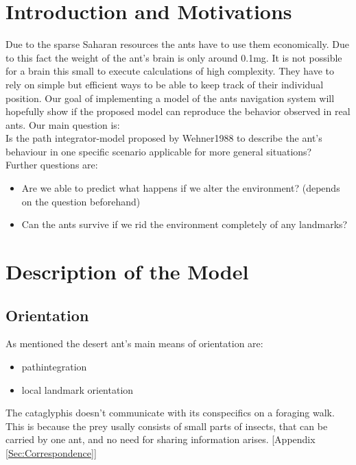 \documentclass[11pt]{article}
\begin{document}
\section{Introduction and Motivations}
 Due to the sparse Saharan resources the ants have to use them economically. Due to this fact the weight of the ant's brain is only around 0.1mg. It is not possible for a brain this small to execute calculations of high complexity. They have to rely on simple but efficient ways to be able to keep track of their individual position. Our goal of implementing a model of the ants navigation system will hopefully show if the proposed model can reproduce the behavior observed in real ants.
Our main question is:\\
Is the path integrator-model proposed by Wehner1988 \cite{Wehner1988} to describe the ant's behaviour in one specific scenario applicable for more general situations?\\
Further questions are:
\begin{itemize}
\item Are we able to predict what happens if we alter the environment? (depends on the question beforehand) 
\item Can the ants survive if we rid the environment completely of any landmarks? 
\end{itemize}


\section{Description of the Model}
\subsection{Orientation}
As mentioned the desert ant's main means of orientation are:
\begin{itemize}
\item pathintegration
\item local landmark orientation
\end{itemize}
The cataglyphis doesn't communicate with its conspecifics on a foraging walk.
This is because the prey usally consists of small parts of insects, that can be carried by one ant, and no need for sharing information arises. [Appendix \ref{Sec:Correspondence}]
\end{document}
